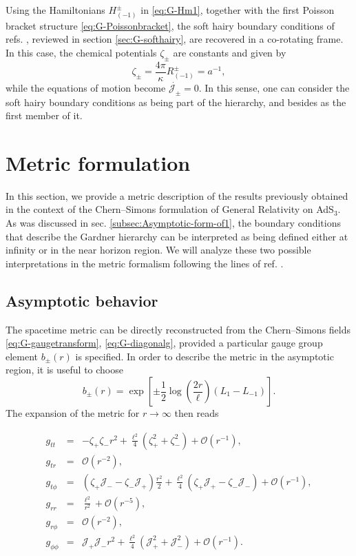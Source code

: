 \documentclass[letterpaper,11pt,oneside]{book}
\begin{document}
Using the Hamiltonians $H_{\left(-1\right)}^{\pm}$ in \eqref{eq:G-Hm1},
together with the first Poisson bracket structure \eqref{eq:G-Poissonbracket},
the soft hairy boundary conditions of refs. \cite{Afshar:2016wfy,Afshar:2016kjj},
reviewed in section \ref{sec:G-softhairy}, are recovered in a co-rotating
frame. In this case, the chemical potentials $\zeta_{\pm}$ are constants
and given by
\[
\zeta_{\pm}=\frac{4\pi}{\kappa}R_{\left(-1\right)}^{\pm}=a^{-1},
\]
while the equations of motion become $\dot{\mathcal{J_{\pm}}}=0$.
In this sense, one can consider the soft hairy boundary conditions
as being part of the hierarchy, and besides as the first member of
it.

\section{Metric formulation\label{sec:G-metric}}

In this section, we provide a metric description of the results previously
obtained in the context of the Chern--Simons formulation of General
Relativity on AdS$_{3}$. As was discussed in sec. \ref{subsec:Asymptotic-form-of1},
the boundary conditions that describe the Gardner hierarchy can be
interpreted as being defined either at infinity or in the near horizon
region. We will analyze these two possible interpretations in the
metric formalism following the lines of ref. \cite{Afshar:2016kjj}.

\subsection{Asymptotic behavior}

The spacetime metric can be directly reconstructed from the Chern--Simons
fields \eqref{eq:G-gaugetransform}, \eqref{eq:G-diagonalg}, provided
a particular gauge group element $b_{\pm}\left(r\right)$ is specified.
In order to describe the metric in the asymptotic region, it is useful
to choose 
\[
b_{\pm}\left(r\right)=\exp\left[\pm\frac{1}{2}\log\left(\frac{2r}{\ell}\right)\left(L_{1}-L_{-1}\right)\right].
\]
The expansion of the metric for $r\rightarrow\infty$ then reads

\begin{eqnarray}
	g_{tt} & = & -\zeta_{+}\zeta_{-}r^{2}+\frac{\ell^{2}}{4}\left(\zeta_{+}^{2}+\zeta_{-}^{2}\right)+\mathcal{O}\left(r^{-1}\right),\nonumber \\
	g_{tr} & = & \mathcal{O}\left(r^{-2}\right),\nonumber \\
	g_{t\phi} & = & \left(\zeta_{+}\mathcal{J}_{-}-\zeta_{-}\mathcal{J}_{+}\right)\frac{r^{2}}{2}+\frac{\ell^{2}}{4}\left(\zeta_{+}\mathcal{J}_{+}-\zeta_{-}\mathcal{J}_{-}\right)+\mathcal{O}\left(r^{-1}\right),\label{eq:AsymptoticMetric}\\
	g_{rr} & = & \frac{\ell^{2}}{r^{2}}+\mathcal{O}\left(r^{-5}\right),\nonumber \\
	g_{r\phi} & = & \mathcal{O}\left(r^{-2}\right),\nonumber \\
	g_{\phi\phi} & = & \mathcal{J_{+}}\mathcal{J_{-}}r^{2}+\frac{\ell^{2}}{4}\left(\mathcal{J}_{+}^{2}+\mathcal{J}_{-}^{2}\right)+\mathcal{O}\left(r^{-1}\right).\nonumber 
\end{eqnarray}
\end{document}
